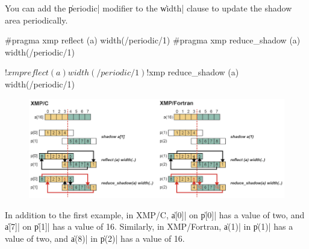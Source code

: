 You can add the \|periodic| modifier to the \|width| clause to update
the shadow area periodically.

\begin{XCexample}
#pragma xmp reflect (a) width(/periodic/1)
#pragma xmp reduce_shadow (a) width(/periodic/1)
\end{XCexample}

\begin{XFexample}
!$xmp reflect (a) width(/periodic/1)
!$xmp reduce_shadow (a) width(/periodic/1)
\end{XFexample}

\begin{figure}
  \centering
  \includegraphics[width=\textwidth]{figs/reduce_shadow_periodic.png}
\end{figure}

In addition to the first example, in XMP/C, \|a[0]| on \|p[0]| has a
value of two, and \|a[7]| on \|p[1]| has a value of 16. Similarly, in
XMP/Fortran, \|a(1)| in \|p(1)| has a value of two, and \|a(8)| in
\|p(2)| has a value of 16.